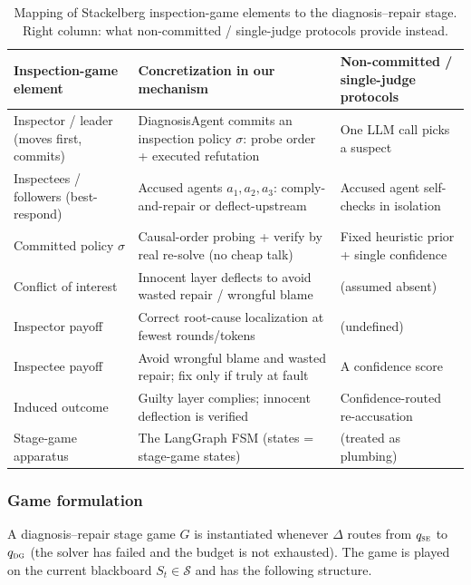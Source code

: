\documentclass[a4paper,fleqn]{cas-sc}
\newcommand{\Scal}{\mathcal{S}}
\begin{document}
\begin{table}[pos=htbp]
\centering
\small
\caption{Mapping of Stackelberg inspection-game elements to the
diagnosis--repair stage. Right column: what non-committed / single-judge
protocols provide instead.}
\label{tab:game_mapping}
\begin{tabularx}{\linewidth}{>{\raggedright\arraybackslash}X >{\raggedright\arraybackslash}X >{\raggedright\arraybackslash}X}
\toprule
Inspection-game element & Concretization in our mechanism & Non-committed / single-judge protocols \\
\midrule
Inspector / leader (moves first, commits) & DiagnosisAgent commits an inspection policy $\sigma$: probe order + executed refutation & One LLM call picks a suspect \\
Inspectees / followers (best-respond) & Accused agents $a_1,a_2,a_3$: comply-and-repair or deflect-upstream & Accused agent self-checks in isolation \\
Committed policy $\sigma$ & Causal-order probing + verify by real re-solve (no cheap talk) & Fixed heuristic prior + single confidence \\
Conflict of interest & Innocent layer deflects to avoid wasted repair / wrongful blame & (assumed absent) \\
Inspector payoff & Correct root-cause localization at fewest rounds/tokens & (undefined) \\
Inspectee payoff & Avoid wrongful blame and wasted repair; fix only if truly at fault & A confidence score \\
Induced outcome & Guilty layer complies; innocent deflection is verified & Confidence-routed re-accusation \\
Stage-game apparatus & The LangGraph FSM (states = stage-game states) & (treated as plumbing) \\
\bottomrule
\end{tabularx}
\end{table}

\subsubsection{Game formulation}
\label{sec:stage_game}

A diagnosis--repair stage game $G$ is instantiated whenever $\Delta$ routes
from $q_{\textsc{se}}$ to $q_{\textsc{dg}}$ (the solver has failed and the
budget is not exhausted). The game is played on the current blackboard
$S_t\in\Scal$ and has the following structure.
\end{document}
